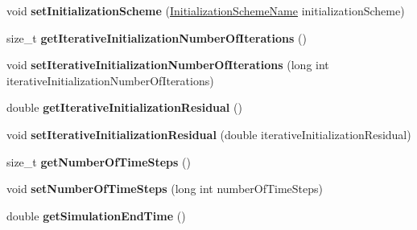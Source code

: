 \begin{DoxyCompactItemize}
\item 
\hypertarget{classnatrium_1_1SolverConfiguration_a4d867b8b8c0c08fc68b95f1a1a52c95d}{
void {\bfseries setInitializationScheme} (\hyperlink{namespacenatrium_a5aad7d448441836f9c631c505cf8cd54}{InitializationSchemeName} initializationScheme)}
\label{classnatrium_1_1SolverConfiguration_a4d867b8b8c0c08fc68b95f1a1a52c95d}

\item 
\hypertarget{classnatrium_1_1SolverConfiguration_aa12123336ffa7489780baa45d99569b1}{
size\_\-t {\bfseries getIterativeInitializationNumberOfIterations} ()}
\label{classnatrium_1_1SolverConfiguration_aa12123336ffa7489780baa45d99569b1}

\item 
\hypertarget{classnatrium_1_1SolverConfiguration_ac4188dce03b129130f153f7028c3f79e}{
void {\bfseries setIterativeInitializationNumberOfIterations} (long int iterativeInitializationNumberOfIterations)}
\label{classnatrium_1_1SolverConfiguration_ac4188dce03b129130f153f7028c3f79e}

\item 
\hypertarget{classnatrium_1_1SolverConfiguration_a966eee9da52af6fbd1f8d5fad2b8427a}{
double {\bfseries getIterativeInitializationResidual} ()}
\label{classnatrium_1_1SolverConfiguration_a966eee9da52af6fbd1f8d5fad2b8427a}

\item 
\hypertarget{classnatrium_1_1SolverConfiguration_ad9551932a38bda46c8ca2ef88a73e754}{
void {\bfseries setIterativeInitializationResidual} (double iterativeInitializationResidual)}
\label{classnatrium_1_1SolverConfiguration_ad9551932a38bda46c8ca2ef88a73e754}

\item 
\hypertarget{classnatrium_1_1SolverConfiguration_a13121a202636553339d5b1f83d196fd7}{
size\_\-t {\bfseries getNumberOfTimeSteps} ()}
\label{classnatrium_1_1SolverConfiguration_a13121a202636553339d5b1f83d196fd7}

\item 
\hypertarget{classnatrium_1_1SolverConfiguration_a50c43893f5c6ed0d73fcccd64f523053}{
void {\bfseries setNumberOfTimeSteps} (long int numberOfTimeSteps)}
\label{classnatrium_1_1SolverConfiguration_a50c43893f5c6ed0d73fcccd64f523053}

\item 
\hypertarget{classnatrium_1_1SolverConfiguration_aa0d9cd3a8d2e6e04fc33e3b4fb8785d9}{
double {\bfseries getSimulationEndTime} ()}
\label{classnatrium_1_1SolverConfiguration_aa0d9cd3a8d2e6e04fc33e3b4fb8785d9}


\end{DoxyCompactItemize}
